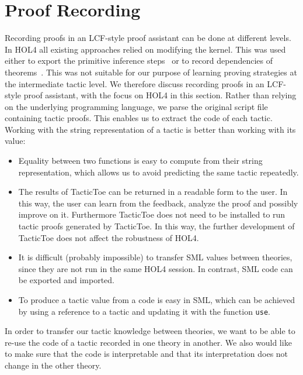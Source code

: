 \documentclass[runningheads,a4paper,draft]{svjour3}
\def\holfour{\textsf{HOL4}\xspace}
\def\sml{\textsf{SML}\xspace}
\def\tactictoe{\textsf{TacticToe}\xspace}
\begin{document}
\section{Proof Recording}\label{sec:recording}
Recording proofs in an LCF-style proof assistant can be done at different
levels.
In \holfour all existing approaches relied on modifying the kernel. This was
used
either to export the primitive inference
steps~\cite{Wong95recordingand,DBLP:conf/itp/KumarH12}
or to record dependencies of theorems~\cite{tgck-cpp15}. This was not suitable
for our
purpose of learning proving strategies at the intermediate tactic level. We
therefore
discuss recording proofs in an LCF-style proof assistant, with the focus on
\holfour
in this section.
%
Rather than relying on the underlying programming language, we parse the
original script file containing tactic proofs. This enables us to extract the
code of each tactic.
Working with the string representation of a tactic is better than working with
its value:
\begin{itemize}
\item Equality between two functions is easy to compute from
their string representation, which allows us to avoid
predicting the same tactic repeatedly.
\item
The
results of
\tactictoe can be returned in a readable form to the user. In this way, the
user can learn from the feedback, analyze the proof and possibly improve on it.
Furthermore \tactictoe does not need to be installed to run
tactic proofs generated by \tactictoe. In this way, the further development of
\tactictoe does not affect the robustness of \holfour.
\item
It is difficult (probably impossible) to transfer \sml values
between theories, since they are not run in the same \holfour session. In
contrast,
\sml code can be exported and imported.
\item To produce a tactic value from a code is easy in \sml, which can be
achieved by using a reference to a tactic and updating it with the function
\texttt{use}.
\end{itemize}

In order to transfer our tactic knowledge between theories, we want to be able
to re-use the code of a tactic recorded in one theory in another.
We also would like to make sure that the code is interpretable and that
its interpretation does not change in the other theory.
\end{document}
